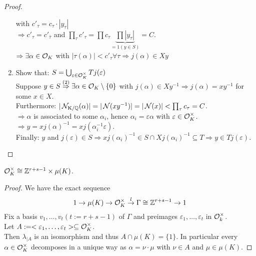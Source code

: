 \begin{proof}
\begin{enumerate}[(1)]
 with $c'_\tau = c_\tau \cdot | y_\tau|$\\
 $\Rightarrow c'_\tau = c'_{\bar{\tau}}$ and
 $\prod_\tau c'_\tau = \prod c_\tau \underbrace{\prod |y_\tau|}_{=1 (y \in S)} = C.$\\
 $\Rightarrow \exists \alpha \in \mathcal{O}_K$ with $|\tau(\alpha)| < c'_\tau \forall \tau \Rightarrow j(\alpha) \in Xy$
 \item Show that: $S= \bigcup_{\varepsilon \in \mathcal{O}^\times_K} Tj(\varepsilon)$\\
 Suppose $y \in S \stackrel{(2)}{\Rightarrow} \exists \alpha \in \mathcal{O}_K \setminus \{0\}$ with $j(\alpha) \in Xy^{-1} \Rightarrow j(\alpha)=xy^{-1}$ for some $x \in X$.\\
Furthermore: $|\operatorname{\mathcal{N}_{K/\mathbb{Q}}}(\alpha)|=|\operatorname{\mathcal{N}}(xy^{-1})|=|\operatorname{\mathcal{N}}(x)|<\prod_\tau c_\tau =C$.\\
$\Rightarrow \alpha$ is associated to some $\alpha_i$, hence $\alpha_i = \varepsilon \alpha$ with $\varepsilon \in \mathcal{O}^\times_K$.\\
$\Rightarrow y = xj(\alpha)^{-1} = xj(\alpha_i^{-1} \varepsilon)$.\\
Finally: $y$ and $j(\varepsilon) \in S \Rightarrow x j(\alpha_i)^{-1} \in S\cap Xj(\alpha_i)^{-1} \subseteq T \Rightarrow y \in T j(\varepsilon)$.
\end{enumerate}
\end{proof}

\begin{Kor}
$\mathcal{O}^\times_K \cong \mathbb{Z}^{r+s-1} \times \mu(K)$.
\end{Kor}

\begin{proof}
We have the exact sequence
\[1 \to \mu(K) \to \mathcal{O}_K^\times \stackrel{l}{\to} \Gamma \cong \mathbb{Z}^{r+s-1} \to 1\]
Fix a basis $v_1, \dots, v_t (t:=r+s-1)$ of $\Gamma$ and preimages $\varepsilon_1, \dots, \varepsilon_t$ in $\mathcal{O}_k^\times$.\\
Let $A:= <\varepsilon_1, \dots, \varepsilon_t> \subseteq \mathcal{O}_K^\times$.\\
Then $\lambda_{|A}$ is an isomorphism and thus $A \cap \mu(K)=\{1\}$. In particular every $\alpha \in \mathcal{O}^\times_K$ decomposes in a unique way as $\alpha = \nu \cdot \mu$ with $\nu \in A$ and $\mu \in \mu(K)$.
\end{proof}
